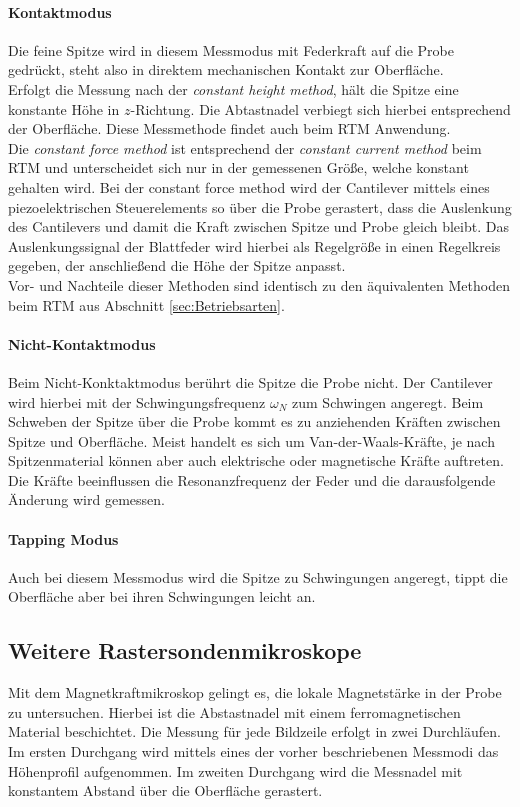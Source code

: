 \documentclass[a4paper,twoside,final]{article}
\begin{document}
\paragraph{Kontaktmodus}
Die feine Spitze wird in diesem Messmodus mit Federkraft auf die Probe gedrückt, steht also in direktem mechanischen Kontakt zur Oberfläche. \\
Erfolgt die Messung nach der \textit{constant height method}, hält die Spitze eine konstante Höhe in $z$-Richtung. Die Abtastnadel verbiegt sich hierbei entsprechend der Oberfläche. Diese Messmethode findet auch beim RTM Anwendung. \\
Die \textit{constant force method} ist entsprechend der \textit{constant current method} beim RTM und unterscheidet sich nur in der gemessenen Größe, welche konstant gehalten wird. Bei der constant force method wird der Cantilever mittels eines piezoelektrischen Steuerelements so über die Probe gerastert, dass die Auslenkung des Cantilevers und damit die Kraft zwischen Spitze und Probe gleich bleibt. Das Auslenkungssignal der Blattfeder wird hierbei als Regelgröße in einen Regelkreis gegeben, der anschließend die Höhe der Spitze anpasst.\\
Vor- und Nachteile dieser Methoden sind identisch zu den äquivalenten Methoden beim RTM aus Abschnitt \ref{sec:Betriebsarten}.

\paragraph{Nicht-Kontaktmodus}
Beim Nicht-Konktaktmodus berührt die Spitze die Probe nicht. Der Cantilever wird hierbei mit der Schwingungsfrequenz $\omega_N$ zum Schwingen angeregt. Beim Schweben der Spitze über die Probe kommt es zu anziehenden Kräften zwischen Spitze und Oberfläche. Meist handelt es sich um Van-der-Waals-Kräfte, je nach Spitzenmaterial können aber auch elektrische oder magnetische Kräfte auftreten. Die Kräfte beeinflussen die Resonanzfrequenz der Feder und die darausfolgende Änderung wird gemessen.

\paragraph{Tapping Modus}
Auch bei diesem Messmodus wird die Spitze zu Schwingungen angeregt, tippt die Oberfläche aber bei ihren Schwingungen leicht an.

\subsection{Weitere Rastersondenmikroskope}
Mit dem Magnetkraftmikroskop gelingt es, die lokale Magnetstärke in der Probe zu untersuchen. Hierbei ist die Abstastnadel mit einem ferromagnetischen Material beschichtet. Die Messung für jede Bildzeile erfolgt in zwei Durchläufen. Im ersten Durchgang wird mittels eines der vorher beschriebenen Messmodi das Höhenprofil aufgenommen. Im zweiten Durchgang wird die Messnadel mit konstantem Abstand über die Oberfläche gerastert.\\
\end{document}
